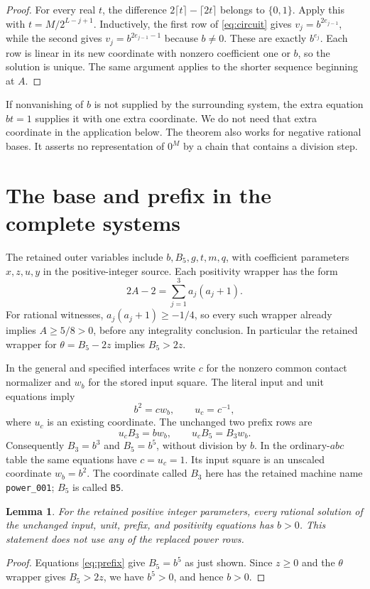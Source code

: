\documentclass[11pt]{article}
\newtheorem{lemma}[theorem]{Lemma}
\begin{document}
\begin{proof}
For every real $t$, the difference
$2\lceil t\rceil-\lceil2t\rceil$ belongs to $\{0,1\}$.
Apply this with $t=M/2^{L-j+1}$.  Inductively, the first row of
\eqref{eq:circuit} gives $v_j=b^{2e_{j-1}}$, while the second gives
$v_j=b^{2e_{j-1}-1}$ because $b\ne0$.  These are exactly $b^{e_j}$.
Each row is linear in its new coordinate with nonzero coefficient
one or $b$, so the solution is unique.  The same argument applies
to the shorter sequence beginning at $A$.
\end{proof}

If nonvanishing of $b$ is not supplied by the surrounding system, the
extra equation $bt=1$ supplies it with one extra coordinate.  We do not
need that extra coordinate in the application below.  The theorem also
works for negative rational bases.  It asserts no representation of
$0^M$ by a chain that contains a division step.

\section{The base and prefix in the complete systems}

The retained outer variables include $b,B_5,g,t,m,q$, with coefficient
parameters $x,z,u,y$ in the positive-integer source.  Each positivity
wrapper has the form
\begin{equation}\label{eq:positive}
 2A-2=\sum_{j=1}^3 a_j(a_j+1).
\end{equation}
For rational witnesses, $a_j(a_j+1)\ge-1/4$, so every such wrapper
already implies $A\ge5/8>0$, before any integrality conclusion.
In particular the retained wrapper for $\theta=B_5-2z$ implies
$B_5>2z$.

In the general and specified interfaces write $c$ for the nonzero
common contact normalizer and $w_b$ for the stored input square.  The
literal input and unit equations imply
\[
 b^2=cw_b,\qquad u_c=c^{-1},
\]
where $u_c$ is an existing coordinate.  The unchanged two prefix rows
are
\begin{equation}\label{eq:prefix}
 u_c B_3=bw_b,\qquad u_c B_5=B_3w_b.
\end{equation}
Consequently $B_3=b^3$ and $B_5=b^5$, without division by $b$.
In the ordinary-$abc$ table the same equations have $c=u_c=1$.
Its input square is an unscaled coordinate $w_b=b^2$.
The coordinate called $B_3$ here has the retained machine name
\texttt{power\_001}; $B_5$ is called \texttt{B5}.

\begin{lemma}\label{lem:base}
For the retained positive integer parameters, every rational solution
of the unchanged input, unit, prefix, and positivity equations has
$b>0$.  This statement does not use any of the replaced power rows.
\end{lemma}
\begin{proof}
Equations \eqref{eq:prefix} give $B_5=b^5$ as just shown.  Since
$z\ge0$ and the $\theta$ wrapper gives $B_5>2z$, we have $b^5>0$,
and hence $b>0$.
\end{proof}
\end{document}
